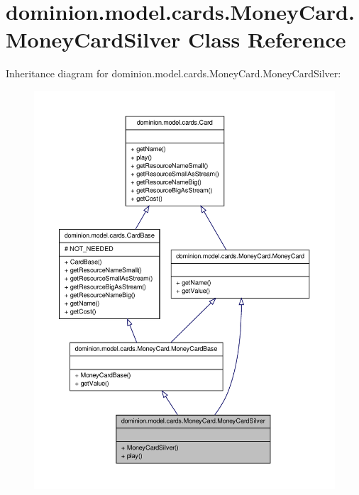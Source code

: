 \hypertarget{classdominion_1_1model_1_1cards_1_1MoneyCard_1_1MoneyCardSilver}{\section{dominion.\-model.\-cards.\-Money\-Card.\-Money\-Card\-Silver \-Class \-Reference}
\label{classdominion_1_1model_1_1cards_1_1MoneyCard_1_1MoneyCardSilver}
}


\-Inheritance diagram for dominion.\-model.\-cards.\-Money\-Card.\-Money\-Card\-Silver\-:
\nopagebreak
\begin{figure}[H]
\begin{center}
\leavevmode
\includegraphics[width=350pt]{classdominion_1_1model_1_1cards_1_1MoneyCard_1_1MoneyCardSilver__inherit__graph}
\end{center}
\end{figure}


